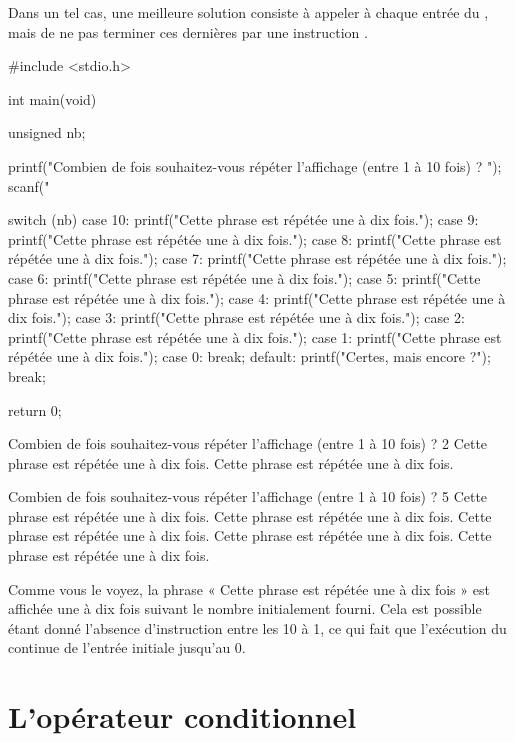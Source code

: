 Dans un tel cas, une meilleure solution consiste à appeler
 à chaque entrée du , mais de ne pas
terminer ces dernières par une instruction .

\begin{C}
#include <stdio.h>


int
main(void)
{
    unsigned nb;

    printf("Combien de fois souhaitez-vous répéter l'affichage (entre 1 à 10 fois) ? ");
    scanf("%

    switch (nb)
    {
    case 10:
        printf("Cette phrase est répétée une à dix fois.\n");
    case 9:
        printf("Cette phrase est répétée une à dix fois.\n");
    case 8:
        printf("Cette phrase est répétée une à dix fois.\n");
    case 7:
        printf("Cette phrase est répétée une à dix fois.\n");
    case 6:
        printf("Cette phrase est répétée une à dix fois.\n");
    case 5:
        printf("Cette phrase est répétée une à dix fois.\n");
    case 4:
        printf("Cette phrase est répétée une à dix fois.\n");
    case 3:
        printf("Cette phrase est répétée une à dix fois.\n");
    case 2:
        printf("Cette phrase est répétée une à dix fois.\n");
    case 1:
        printf("Cette phrase est répétée une à dix fois.\n");
    case 0:
        break;
    default:
        printf("Certes, mais encore ?\n");
        break;
    }

    return 0;
}
\end{C}

\begin{C}
Combien de fois souhaitez-vous répéter l'affichage (entre 1 à 10 fois) ? 2
Cette phrase est répétée une à dix fois.
Cette phrase est répétée une à dix fois.

Combien de fois souhaitez-vous répéter l'affichage (entre 1 à 10 fois) ? 5
Cette phrase est répétée une à dix fois.
Cette phrase est répétée une à dix fois.
Cette phrase est répétée une à dix fois.
Cette phrase est répétée une à dix fois.
Cette phrase est répétée une à dix fois.
\end{C}

Comme vous le voyez, la phrase « Cette phrase est répétée une à dix fois
» est affichée une à dix fois suivant le nombre initialement fourni.
Cela est possible étant donné l'absence d'instruction 
entre les  10 à 1, ce qui fait que l'exécution du
 continue de l'entrée initiale jusqu'au  0.

\section{L'opérateur conditionnel}
\label{loperateur-conditionnel}

